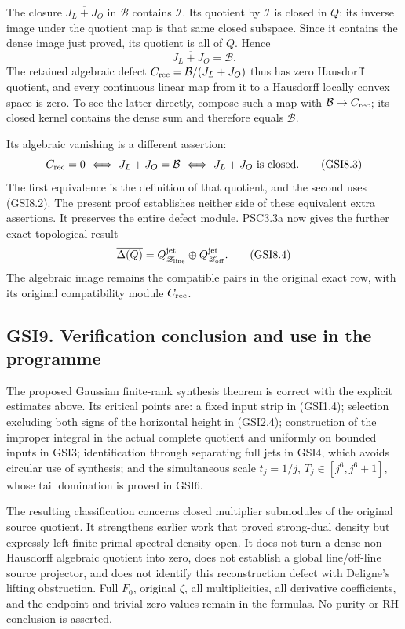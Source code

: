 The closure \(\overline{J_L+J_O}\) in \(\mathcal B\) contains
\(\mathcal I\). Its quotient by \(\mathcal I\) is closed in \(Q\): its
inverse image under the quotient map is that same closed subspace. Since
it contains the dense image just proved, its quotient is all of \(Q\).
Hence \[
\boxed{\overline{J_L+J_O}=\mathcal B.}
\tag{GSI8.2}
\] The retained algebraic defect \(C_{\rm rec}=\mathcal B/(J_L+J_O)\)
thus has zero Hausdorff quotient, and every continuous linear map from
it to a Hausdorff locally convex space is zero. To see the latter
directly, compose such a map with \(\mathcal B\to C_{\rm rec}\); its
closed kernel contains the dense sum and therefore equals
\(\mathcal B\).

Its algebraic vanishing is a different assertion: \[
C_{\rm rec}=0
\ \Longleftrightarrow\ J_L+J_O=\mathcal B
\ \Longleftrightarrow\ J_L+J_O\text{ is closed}.
\tag{GSI8.3}
\] The first equivalence is the definition of that quotient, and the
second uses (GSI8.2). The present proof establishes neither side of
these equivalent extra assertions. It preserves the entire defect
module. PSC3.3a now gives the further exact topological result \[
\overline{\Delta(Q)}
=Q_{\mathscr Z_{\rm line}}^{\rm jet}
\oplus Q_{\mathscr Z_{\rm off}}^{\rm jet}.
\tag{GSI8.4}
\] The algebraic image remains the compatible pairs in the original
exact row, with its original compatibility module \(C_{\rm rec}\).

\subsection{GSI9. Verification conclusion and use in the
programme}\label{gsi9.-verification-conclusion-and-use-in-the-programme}

The proposed Gaussian finite-rank synthesis theorem is correct with the
explicit estimates above. Its critical points are: a fixed input strip
in (GSI1.4); selection excluding both signs of the horizontal height in
(GSI2.4); construction of the improper integral in the actual complete
quotient and uniformly on bounded inputs in GSI3; identification through
separating full jets in GSI4, which avoids circular use of synthesis;
and the simultaneous scale \(t_j=1/j\), \(T_j\in[j^6,j^6+1]\), whose
tail domination is proved in GSI6.

The resulting classification concerns closed multiplier submodules of
the original source quotient. It strengthens earlier work that proved
strong-dual density but expressly left finite primal spectral density
open. It does not turn a dense non-Hausdorff algebraic quotient into
zero, does not establish a global line/off-line source projector, and
does not identify this reconstruction defect with Deligne's lifting
obstruction. Full \(F_0\), original \(\zeta\), all multiplicities, all
derivative coefficients, and the endpoint and trivial-zero values remain
in the formulas. No purity or RH conclusion is asserted.

